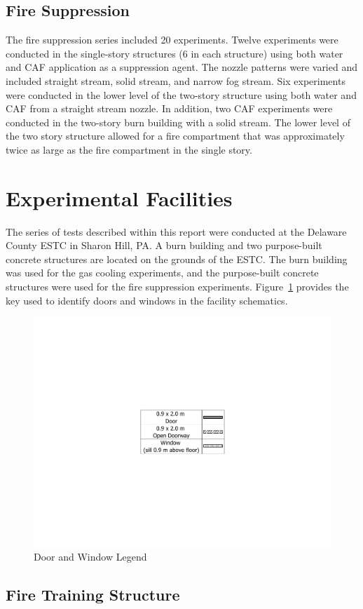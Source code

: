\documentclass[12pt,oneside]{book}
\begin{document}
\subsection{Fire Suppression}
\label{sec:desc_Fire_Suppression}

The fire suppression series included 20 experiments. Twelve experiments were conducted in the single-story structures (6 in each structure) using both water and CAF application as a suppression agent. The nozzle patterns were varied and included straight stream, solid stream, and narrow fog stream. Six experiments were conducted in the lower level of the two-story structure using both water and CAF from a straight stream nozzle.  In addition, two CAF experiments were conducted in the two-story burn building with a solid stream. The lower level of the two story structure allowed for a fire compartment that was approximately twice as large as the fire compartment in the single story.

\section{Experimental Facilities}
\label{sec:Experimental_Facility}

The series of tests described within this report were conducted at the Delaware County ESTC in Sharon Hill, PA. A burn building and two purpose-built concrete structures are located on the grounds of the ESTC. The burn building was used for the gas cooling experiments, and the purpose-built concrete structures were used for the fire suppression experiments. Figure~\ref{fig:Door_Status_Legend} provides the key used to identify doors and windows in the facility schematics.

\begin{figure}[!ht]
	\includegraphics[width=.35\columnwidth]{../Figures/Floor_Plans/PDFs/DelCo_2012_Door_Legend}
	\caption{Door and Window Legend}
	\label{fig:Door_Status_Legend}
\end{figure}

\subsection{Fire Training Structure}
\label{sec:Burn_Building}
\end{document}
